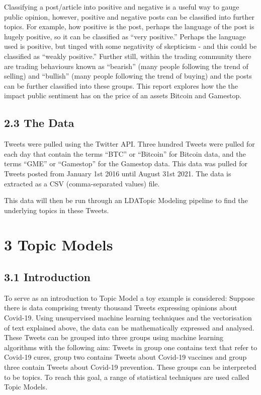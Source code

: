 \documentclass[
]{article}
\begin{document}
Classifying a post/article into positive and negative is a useful way to
gauge public opinion, however, positive and negative posts can be
classified into further topics. For example, how positive is the post,
perhaps the language of the post is hugely positive, so it can be
classified as ``very positive.'' Perhaps the language used is positive,
but tinged with some negativity of skepticism - and this could be
classified as ``weakly positive.'' Further still, within the trading
community there are trading behaviours known as ``bearish'' (many people
following the trend of selling) and ``bullish'' (many people following
the trend of buying) and the posts can be further classified into these
groups. This report explores how the the impact public sentiment has on
the price of an assets Bitcoin and Gamestop.

\hypertarget{the-data}{%
\subsection{2.3 The Data}\label{the-data}}

Tweets were pulled using the Twitter API. Three hundred Tweets were
pulled for each day that contain the terms ``BTC'' or ``Bitcoin'' for
Bitcoin data, and the terms ``GME'' or ``Gamestop'' for the Gamestop
data. This data was pulled for Tweets posted from January 1st 2016 until
August 31st 2021. The data is extracted as a CSV (comma-separated
values) file.

This data will then be run through an LDATopic Modeling pipeline to find
the underlying topics in these Tweets.

\newpage

\hypertarget{topic-models}{%
\section{3 Topic Models}\label{topic-models}}

\hypertarget{introduction}{%
\subsection{3.1 Introduction}\label{introduction}}

To serve as an introduction to Topic Model a toy example is considered:
Suppose there is data comprising twenty thousand Tweets expressing
opinions about Covid-19. Using unsupervised machine learning techniques
and the vectorisation of text explained above, the data can be
mathematically expressed and analysed. These Tweets can be grouped into
three groups using machine learning algorithms with the following aim:
Tweets in group one contains text that refer to Covid-19 cures, group
two contains Tweets about Covid-19 vaccines and group three contain
Tweets about Covid-19 prevention. These groups can be interpreted to be
topics. To reach this goal, a range of statistical techniques are used
called Topic Models.
\end{document}
